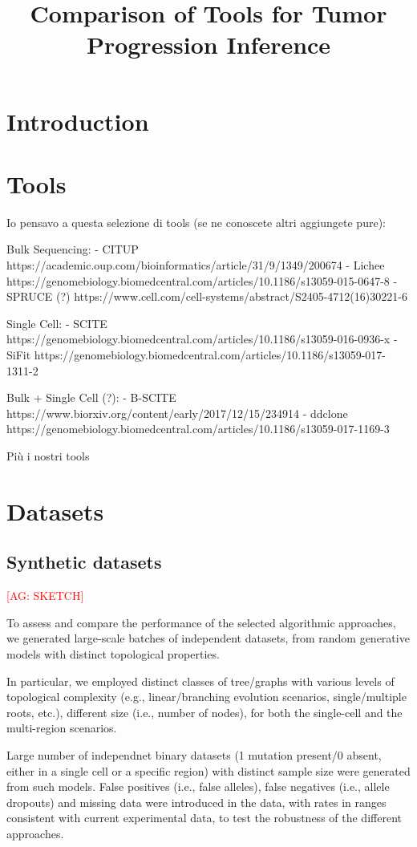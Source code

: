 \documentclass{article}
\title{Comparison of Tools for Tumor Progression Inference}
\author{}
\date{}
\begin{document}
\maketitle

\section{Introduction}

\section{Tools}
Io pensavo a questa selezione di tools (se ne conoscete altri aggiungete pure):

Bulk Sequencing:
- CITUP https://academic.oup.com/bioinformatics/article/31/9/1349/200674
- Lichee https://genomebiology.biomedcentral.com/articles/10.1186/s13059-015-0647-8
- SPRUCE (?) https://www.cell.com/cell-systems/abstract/S2405-4712(16)30221-6

Single Cell:
- SCITE https://genomebiology.biomedcentral.com/articles/10.1186/s13059-016-0936-x
- SiFit https://genomebiology.biomedcentral.com/articles/10.1186/s13059-017-1311-2

Bulk + Single Cell (?):
- B-SCITE https://www.biorxiv.org/content/early/2017/12/15/234914
- ddclone https://genomebiology.biomedcentral.com/articles/10.1186/s13059-017-1169-3

Più i nostri tools

\section{Datasets}

\subsection{Synthetic datasets}
\textcolor{red}{[AG: SKETCH]}

To assess and compare the performance of the selected algorithmic approaches, we generated large-scale batches of independent datasets, from random generative models with distinct topological properties. 

In particular, we employed distinct classes of tree/graphs with various levels of topological complexity (e.g., linear/branching evolution scenarios, single/multiple roots, etc.), different size (i.e., number of nodes), for both the single-cell and the multi-region scenarios. 

Large number of independnet binary datasets (1 mutation present/0 absent, either in a single cell or a specific region) with distinct sample size were generated from such models. 
False positives (i.e., false alleles), false negatives (i.e., allele dropouts) and missing data were introduced in the data, with rates in ranges consistent with current experimental data, to test the robustness of the different approaches. 
\end{document}
